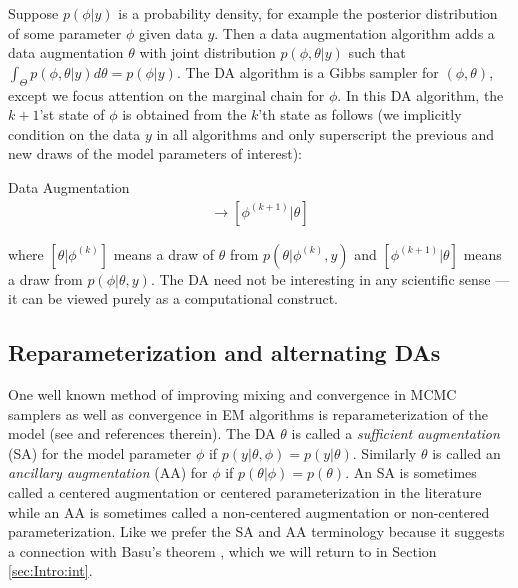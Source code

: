 \documentclass[12pt]{article}
\begin{document}
Suppose $p(\phi|y)$ is a probability density, for example the posterior distribution of some parameter $\phi$ given data $y$. %
Then a data augmentation algorithm adds a data augmentation $\theta$ with joint distribution $p(\phi,\theta|y)$ such that $\int_{\Theta}p(\phi,\theta|y)d\theta = p(\phi|y)$. The DA algorithm is a Gibbs sampler for $(\phi,\theta)$, except we focus attention on the marginal chain for $\phi$. In this DA algorithm, the $k+1$'st state of $\phi$ is obtained from the $k$'th state as follows (we implicitly condition on the data $y$ in all algorithms and only superscript the previous and new draws of the model parameters of interest):
\begin{alg*}[DA]Data Augmentation\label{alg:DA}
  \begin{align*}
  [\theta|\phi^{(k)}] \to [\phi^{(k+1)}|\theta]
\end{align*}
\end{alg*}
\noindent where $[\theta|\phi^{(k)}]$ means a draw of $\theta$ from $p(\theta|\phi^{(k)},y)$ and $[\phi^{(k+1)}|\theta]$ means a draw from $p(\phi|\theta,y)$. The DA need not be interesting in any scientific sense --- it can be viewed purely as a computational construct. 

\subsection{Reparameterization and alternating DAs}

One well known method of improving mixing and convergence in MCMC samplers as well as convergence in EM algorithms is reparameterization of the model (see  \citet{papaspiliopoulos2007general} and references therein). The DA $\theta$ is called a {\it sufficient augmentation} (SA) for the model parameter $\phi$ if $p(y|\theta,\phi)=p(y|\theta)$. Similarly $\theta$ is called an {\it ancillary augmentation} (AA) for $\phi$ if $p(\theta|\phi)=p(\theta)$. An SA is sometimes called a centered augmentation or centered parameterization in the literature while an AA is sometimes called a non-centered augmentation or non-centered parameterization. Like \citet{yu2011center} we prefer the SA and AA terminology because it suggests a connection with Basu's theorem \citep{basu1955statistics}, which we will return to in Section \ref{sec:Intro:int}.
\end{document}
